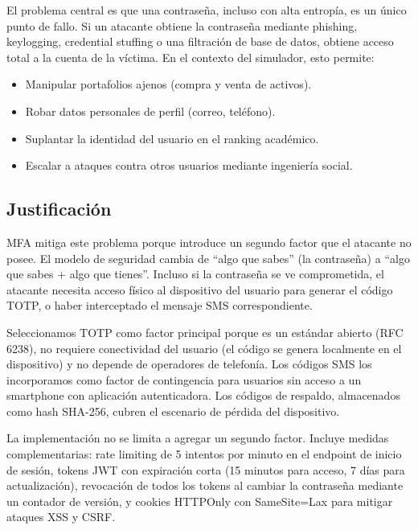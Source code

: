 \documentclass[12pt,letterpaper]{article}
\begin{document}
El problema central es que una contrase\~na, incluso con alta entrop\'ia, es un \'unico punto de fallo. Si un atacante obtiene la contrase\~na mediante phishing, keylogging, credential stuffing o una filtraci\'on de base de datos, obtiene acceso total a la cuenta de la v\'ictima. En el contexto del simulador, esto permite:
\begin{itemize}
    \item Manipular portafolios ajenos (compra y venta de activos).
    \item Robar datos personales de perfil (correo, tel\'efono).
    \item Suplantar la identidad del usuario en el ranking acad\'emico.
    \item Escalar a ataques contra otros usuarios mediante ingenier\'ia social.
\end{itemize}

\subsection{Justificaci\'on}

MFA mitiga este problema porque introduce un segundo factor que el atacante no posee. El modelo de seguridad cambia de ``algo que sabes'' (la contrase\~na) a ``algo que sabes + algo que tienes''. Incluso si la contrase\~na se ve comprometida, el atacante necesita acceso f\'isico al dispositivo del usuario para generar el c\'odigo TOTP, o haber interceptado el mensaje SMS correspondiente.

Seleccionamos TOTP como factor principal porque es un est\'andar abierto (RFC 6238), no requiere conectividad del usuario (el c\'odigo se genera localmente en el dispositivo) y no depende de operadores de telefon\'ia. Los c\'odigos SMS los incorporamos como factor de contingencia para usuarios sin acceso a un smartphone con aplicaci\'on autenticadora. Los c\'odigos de respaldo, almacenados como hash SHA-256, cubren el escenario de p\'erdida del dispositivo.

La implementaci\'on no se limita a agregar un segundo factor. Incluye medidas complementarias: rate limiting de 5 intentos por minuto en el endpoint de inicio de sesi\'on, tokens JWT con expiraci\'on corta (15 minutos para acceso, 7 d\'ias para actualizaci\'on), revocaci\'on de todos los tokens al cambiar la contrase\~na mediante un contador de versi\'on, y cookies HTTPOnly con SameSite=Lax para mitigar ataques XSS y CSRF.

\end{document}
